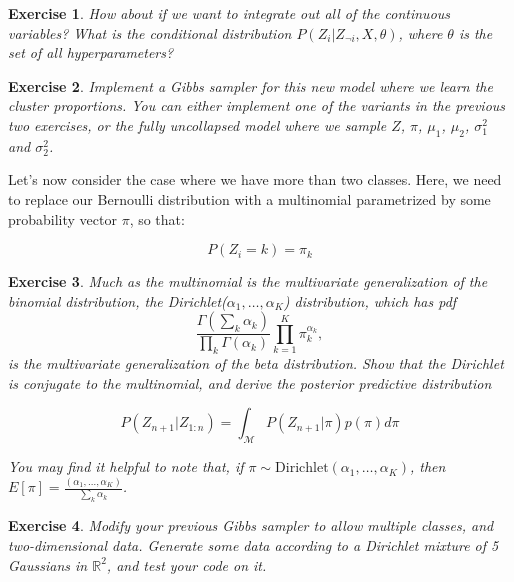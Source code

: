 \documentclass[twoside]{article}
\newcounter{lecnum}
\newtheorem{exercise}{Exercise}[lecnum]
\begin{document}
\begin{exercise}
  How about if we want to integrate out all of the continuous variables? What is the conditional distribution $P(Z_i|Z_{\neg i}, X, \theta)$, where $\theta$ is the set of all hyperparameters?
\end{exercise}

\begin{exercise}
  Implement a Gibbs sampler for this new model where we learn the cluster proportions. You can either implement one of the variants in the previous two exercises, or the fully uncollapsed model where we sample $Z$, $\pi$, $\mu_1$, $\mu_2$, $\sigma^2_1$ and $\sigma^2_2$.
\end{exercise}


Let's now consider the case where we have more than two classes. Here, we need to replace our Bernoulli distribution with a multinomial parametrized by some probability vector $\pi$, so that:

$$P(Z_i = k) = \pi_k$$

\begin{exercise}
  Much as the multinomial is the multivariate generalization of the binomial distribution, the Dirichlet($\alpha_1,\dots,\alpha_K$) distribution, which has pdf
  $$\frac{\Gamma(\sum_k \alpha_k)}{\prod_k \Gamma(\alpha_k)} \prod_{k=1}^K \pi_k^{\alpha_k},$$
  is the multivariate generalization of the beta distribution. Show that the Dirichlet is conjugate to the multinomial, and derive the posterior predictive distribution

  $$P(Z_{n+1}|Z_{1:n}) = \int_{\mathcal{M}} P(Z_{n+1}|\pi)p(\pi) d\pi$$

  You may find it helpful to note that, if $\pi\sim \mbox{Dirichlet}(\alpha_1,\dots,\alpha_K)$, then $E[\pi] = \frac{(\alpha_1,\dots,\alpha_K)}{\sum_k\alpha_k}$.
\end{exercise}

 \begin{exercise}
   Modify your previous Gibbs sampler to allow multiple classes, and two-dimensional data. Generate some data according to a Dirichlet mixture of 5 Gaussians in $\mathbb{R}^2$, and test your code on it.

\end{exercise}

  
  
  
\end{document}

